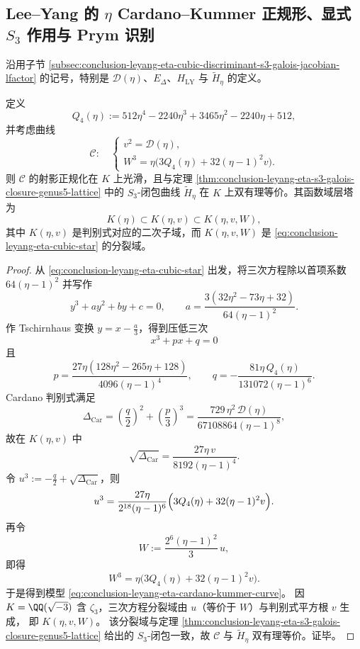 \subsection{Lee--Yang 的 \texorpdfstring{$\eta$}{eta} Cardano--Kummer 正规形、显式 \texorpdfstring{$S_3$}{S3} 作用与 Prym 识别}\label{subsec:conclusion-leyang-eta-cardano-kummer-s3-prym-transposition-mw}
沿用子节 \ref{subsec:conclusion-leyang-eta-cubic-discriminant-s3-galois-jacobian-lfactor} 的记号，特别是
\(\mathscr D(\eta)\)、\(E_\Delta\)、\(H_{\mathrm{LY}}\) 与 \(\widetilde H_\eta\) 的定义。

\begin{theorem}\label{thm:conclusion-leyang-eta-cardano-kummer-normal-form}
定义
\[
Q_4(\eta):=512\eta^4-2240\eta^3+3465\eta^2-2240\eta+512,
\]
并考虑曲线
\begin{equation}\label{eq:conclusion-leyang-eta-cardano-kummer-curve}
\mathcal C:\quad
\begin{cases}
v^2=\mathscr D(\eta),\\[1mm]
W^3=\eta\bigl(3Q_4(\eta)+32(\eta-1)^2v\bigr).
\end{cases}
\end{equation}
则 \(\mathcal C\) 的射影正规化在 \(K\) 上光滑，且与定理
\ref{thm:conclusion-leyang-eta-s3-galois-closure-genus5-lattice}
中的 \(S_3\)-闭包曲线 \(\widetilde H_\eta\) 在 \(K\) 上双有理等价。其函数域层塔为
\[
K(\eta)\subset K(\eta,v)\subset K(\eta,v,W),
\]
其中 \(K(\eta,v)\) 是判别式对应的二次子域，而 \(K(\eta,v,W)\) 是
\eqref{eq:conclusion-leyang-eta-cubic-star} 的分裂域。
\end{theorem}
\begin{proof}
从 \eqref{eq:conclusion-leyang-eta-cubic-star} 出发，将三次方程除以首项系数 \(64(\eta-1)^2\) 并写作
\[
y^3+ay^2+by+c=0,\qquad
a=\frac{3(32\eta^2-73\eta+32)}{64(\eta-1)^2}.
\]
作 Tschirnhaus 变换 \(y=x-\frac a3\)，得到压低三次
\[
x^3+px+q=0
\]
且
\[
p=\frac{27\eta(128\eta^2-265\eta+128)}{4096(\eta-1)^4},\qquad
q=-\frac{81\eta\,Q_4(\eta)}{131072(\eta-1)^6}.
\]
Cardano 判别式满足
\[
\Delta_{\mathrm{Car}}
=\left(\frac q2\right)^2+\left(\frac p3\right)^3
=\frac{729\,\eta^2\,\mathscr D(\eta)}{67108864(\eta-1)^8},
\]
故在 \(K(\eta,v)\) 中
\[
\sqrt{\Delta_{\mathrm{Car}}}
=\frac{27\eta\,v}{8192(\eta-1)^4}.
\]
令 \(u^3:=-\frac q2+\sqrt{\Delta_{\mathrm{Car}}}\)，则
\[
u^3
=\frac{27\eta}{2^{18}(\eta-1)^6}
\Bigl(3Q_4(\eta)+32(\eta-1)^2v\Bigr).
\]
再令
\[
W:=\frac{2^6(\eta-1)^2}{3}\,u,
\]
即得
\[
W^3=\eta\bigl(3Q_4(\eta)+32(\eta-1)^2v\bigr).
\]
于是得到模型 \eqref{eq:conclusion-leyang-eta-cardano-kummer-curve}。
因 \(K=\QQ(\sqrt{-3})\) 含 \(\zeta_3\)，三次方程分裂域由
\(u\)（等价于 \(W\)）与判别式平方根 \(v\) 生成，
即 \(K(\eta,v,W)\)。
该分裂域与定理
\ref{thm:conclusion-leyang-eta-s3-galois-closure-genus5-lattice}
给出的 \(S_3\)-闭包一致，故 \(\mathcal C\) 与 \(\widetilde H_\eta\) 双有理等价。证毕。
\end{proof}

